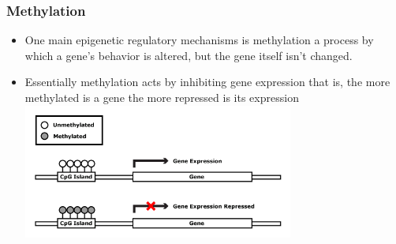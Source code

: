 \documentclass[handout]{beamer}
\begin{document}
\begin{frame}[fragile]\frametitle{Methylation}
\label{sec-1.8}
\begin{itemize}
\item One main epigenetic regulatory mechanisms is methylation a process by which a gene's behavior is altered, but the gene itself isn't changed.\\
\label{sec-1.8.1}
\item Essentially methylation acts by inhibiting gene expression that is, the more methylated is a gene the more repressed is its expression\\
\label{sec-1.8.2}
\includegraphics[width=0.7\textwidth]{./images/methylationAction1.png}
\end{itemize} %
\end{frame}
\end{document}
